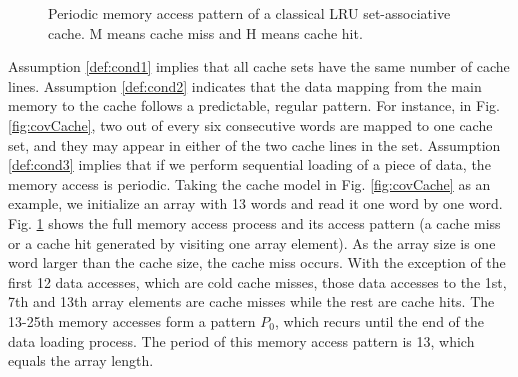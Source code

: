 \documentclass[10pt,journal,compsoc]{IEEEtran}
\theoremstyle{definition}
\begin{document}
\begin{figure}
\centering
{}
\vspace{-1em}
\caption{Periodic memory access pattern of a classical LRU set-associative cache. M means cache miss and H means cache hit.}
\label{fig:PeriodicOutput}
\end{figure}

Assumption \ref{def:cond1} implies that all cache sets have the same number of cache lines. Assumption \ref{def:cond2} indicates that the data mapping from the main memory to the cache follows a predictable, regular pattern. For instance, in Fig. \ref{fig:covCache}, two out of every six consecutive words are mapped to one cache set, and they may appear in either of the two cache lines in the set. Assumption \ref{def:cond3} implies that if we perform sequential loading of a piece of data, the memory access is periodic. Taking the cache model in Fig. \ref{fig:covCache} as an example, we initialize an array with 13 words and read it one word by one word. Fig. \ref{fig:PeriodicOutput} shows the full memory access process and its access pattern (a cache miss or a cache hit generated by visiting one array element). As the array size is one word larger than the cache size, the cache miss occurs. With the exception of the first 12 data accesses, which are cold cache misses, those data accesses to the 1st, 7th and 13th array elements are cache misses while the rest are cache hits. The 13-25th memory accesses form a pattern $P_0$, which recurs until the end of the data loading process. The period of this memory access pattern is 13, which equals the array length.
\end{document}
